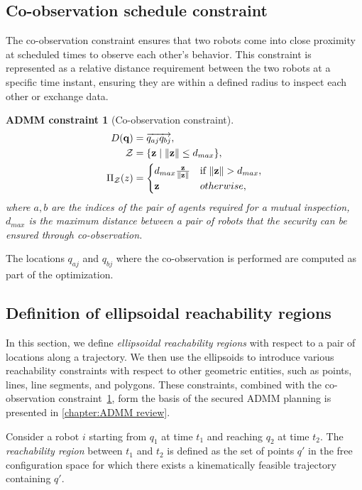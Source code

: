 \documentclass[10pt,twocolumn,twoside]{IEEEtran}
\newtheorem{constraint}{ADMM constraint}
\def\sZ{\mathcal{Z}}
\begin{document}
\subsection{Co-observation schedule constraint}\label{sec:co-observation-constraint}
The co-observation constraint ensures that two robots come into close proximity at scheduled times to observe each other's behavior. This constraint is represented as a relative distance requirement between the two robots at a specific time instant, ensuring they are within a defined radius to inspect each other or exchange data.
\begin{constraint}[Co-observation constraint]\label{constraint:coobservation}
\begin{align}
D(\vq) &= \overrightarrow{q_{aj}q_{bj}}, \label{eq:coobservation_constraint}\\
  \sZ &= \{\vz \mid \norm{\vz} \leq d_{max} \},\\
   \Pi_\sZ(z) & = \begin{cases}
d_{max}\frac{\vz}{\norm{\vz}} &\text{if } \norm{\vz} > d_{max},\\
\vz	& otherwise,
\end{cases}
\end{align}
where $a,b$ are the indices of the pair of agents required for a mutual inspection, $d_{max}$ is the maximum distance between a pair of robots that the security can be ensured through co-observation.
\end{constraint}
The locations $q_{aj}$ and $q_{bj}$ where the co-observation is performed are computed as part of the optimization.

\subsection{Definition of ellipsoidal reachability regions}\label{sec:reachability}

In this section, we define \emph{ellipsoidal reachability regions} with respect to a pair of locations along a trajectory. We then use the ellipsoids to introduce various reachability constraints with respect to other geometric entities, such as points, lines, line segments, and polygons. These constraints, combined with the co-observation constraint~\ref{constraint:coobservation}, form the basis of the secured ADMM planning is presented in \cref{chapter:ADMM review}.

\begin{definition}\label{sec:ellipsoidal definition}
Consider a robot $i$ starting from $q_{1}$ at time $t_1$ and reaching $q_{2}$ at time $t_2$. The \emph{reachability region} between $t_1$ and $t_2$ is defined as the set of points $q'$ in the free configuration space for which there exists a kinematically feasible trajectory containing $q'$.
\end{definition}
\end{document}
